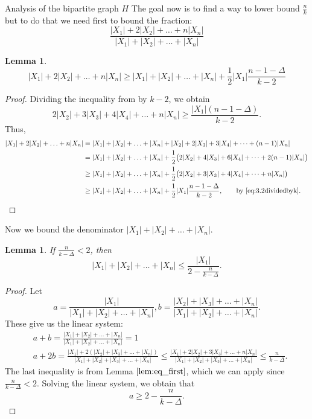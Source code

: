 \documentclass[11pt, letterpaper]{article}
\theoremstyle{plain}
\theoremstyle{plain}
\newtheorem{lemma}[theorem]{Lemma}
\newcommand{\Xsum}{|X_1|+|X_2|+\ldots+|X_n|}
\newcommand{\wXsum}{|X_1|+2|X_2|+\ldots +n|X_n|}
\newcommand{\tXsum}{|X_2|+|X_3|+\ldots+|X_n|}
\begin{document}
\begin{section}{Analysis of the bipartite graph $H$}
The goal now is to find a way to lower bound $\frac{n}{k}$ but to do that we need first to bound the fraction: $$\frac{\wXsum}{\Xsum}$$
\begin{lemma}\label{lem:sum_lower_bound}
$$\wXsum \geq\Xsum + \frac{1}{2}|X_1|\frac{n-1-\Delta}{k-2}$$
\end{lemma}
\begin{proof}
Dividing the inequality from  by $k-2$, we obtain
\begin{equation}\label{eq:3.2dividedbyk}
     2|X_2|+3|X_3|+4|X_4|+\ldots +n|X_n| \geq \frac{|X_1|(n-1-\Delta) }{k-2}.
\end{equation}
Thus, 
\begin{align*}
    \wXsum
    &= \Xsum + |X_2| + 2|X_3| + 3|X_4| + \cdots + (n-1)|X_n| \\
    &= \Xsum
       + \frac{1}{2}\bigl(
           2|X_2| + 4|X_3| + 6|X_4| + \cdots + 2(n-1)|X_n|
         \bigr) \\
    &\geq \Xsum
       + \frac{1}{2}\bigl(
           2|X_2| + 3|X_3| + 4|X_4| + \cdots + n|X_n|
         \bigr) \\
    &\geq \Xsum
       + \frac{1}{2}|X_1|
         \frac{n-1-\Delta}{k-2},
       \qquad\text{by \eqref{eq:3.2dividedbyk}.}
\end{align*}
\end{proof}
Now we bound the denominator $\Xsum$.
\begin{lemma}\label{3.6:lem-den} %
If $\frac n {k-\Delta} < 2$, then
        $$\Xsum \leq \frac{|X_1|}{2-\frac{n}{k-\Delta}}.$$
    \end{lemma}
    \begin{proof}
        Let $$a=\frac{|X_1|}{\Xsum},b=\frac{\tXsum}{\Xsum}.$$
       These give us the linear system: 
       \begin{align*}
           &a+b=\frac{\Xsum}{\Xsum}=1 \\
           &a+2b=\frac{|X_1|+2(|X_2|+|X_3|+\ldots+ |X_n|)}{|X_1|+|X_2|+|X_3|+\ldots+ |X_n|}\leq \frac{|X_1|+2|X_2|+3|X_3|+\ldots+ n|X_n|}{|X_1|+|X_2|+|X_3|+\ldots+ |X_n|}\leq \frac{n}{k-\Delta}.
       \end{align*}
        The last inequality is from Lemma $\ref{lem:eq_first}$, which we can apply since $\frac n {k-\Delta}< 2$.
        Solving the linear system, we obtain that 
        $$a\geq 2-\frac{n}{k-\Delta}.$$


\end{proof}
\end{section}
\end{document}
